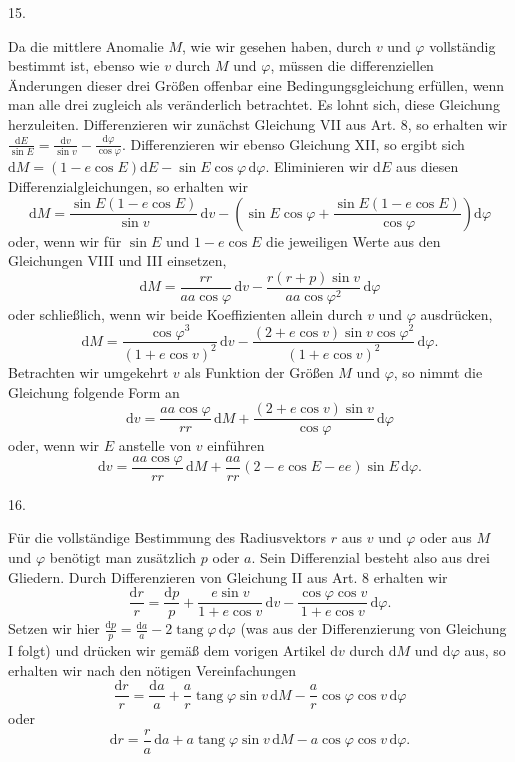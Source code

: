 \par{}
\begin{center}
\hypertarget{native-033-article015}{}15.
\end{center}
Da die mittlere Anomalie $M$, wie wir gesehen haben, durch $v$ und $\varphi$ vollständig bestimmt ist, ebenso wie $v$ durch $M$ und $\varphi$, müssen die differenziellen Änderungen dieser drei Größen offenbar eine Bedingungsgleichung erfüllen, wenn man alle drei zugleich als veränderlich betrachtet. Es lohnt sich, diese Gleichung herzuleiten. Differenzieren wir zunächst Gleichung VII aus Art. 8, so erhalten wir $\frac{\mathrm{d}E}{\sin E}=\frac{\mathrm{d}v}{\sin v}-\frac{\mathrm{d}\varphi}{\cos\varphi}$. Differenzieren wir ebenso Gleichung XII, so ergibt sich $\mathrm{d}M=(1-e\cos E)\mathrm{d}E-\sin E\cos\varphi\,\mathrm{d}\varphi$. Eliminieren wir $\mathrm{d}E$ aus diesen Differenzialgleichungen, so erhalten wir
\[
\mathrm{d}M=\frac{\sin E(1-e\cos E)}{\sin v}\,\mathrm{d}v-\left(\sin E\cos\varphi+\frac{\sin E(1-e\cos E)}{\cos\varphi}\right)\mathrm{d}\varphi
\]
oder, wenn wir für $\sin E$ und $1-e\cos E$ die jeweiligen Werte aus den Gleichungen VIII und III einsetzen,
\[
\mathrm{d}M=\frac{r r}{a a\cos\varphi}\,\mathrm{d}v-\frac{r(r+p)\sin v}{a a\cos\varphi^2}\,\mathrm{d}\varphi
\]
oder schließlich, wenn wir beide Koeffizienten allein durch $v$ und $\varphi$ ausdrücken,
\[
\mathrm{d}M=\frac{\cos\varphi^3}{(1+e\cos v)^2}\,\mathrm{d}v-\frac{(2+e\cos v)\sin v\cos\varphi^2}{(1+e\cos v)^2}\,\mathrm{d}\varphi.
\]
Betrachten wir umgekehrt $v$ als Funktion der Größen $M$ und $\varphi$, so nimmt die Gleichung folgende Form an
\[
\mathrm{d}v=\frac{a a\cos\varphi}{r r}\,\mathrm{d}M+\frac{(2+e\cos v)\sin v}{\cos\varphi}\,\mathrm{d}\varphi
\]
oder, wenn wir $E$ anstelle von $v$ einführen\,
\[
\mathrm{d}v=\frac{a a\cos\varphi}{r r}\,\mathrm{d}M+\frac{a a}{r r}(2-e\cos E-e e)\sin E\,\mathrm{d}\varphi.
\]

\par{}
\begin{center}
\hypertarget{native-034-article016}{}16.
\end{center}
Für die vollständige Bestimmung des Radiusvektors $r$ aus $v$ und $\varphi$ oder aus $M$ und $\varphi$ benötigt man zusätzlich $p$ oder $a$. Sein Differenzial besteht also aus drei Gliedern. Durch Differenzieren von Gleichung II aus Art. 8 erhalten wir
\[
\frac{\mathrm{d}r}{r}=\frac{\mathrm{d}p}{p}+\frac{e\sin v}{1+e\cos v}\,\mathrm{d}v-\frac{\cos\varphi\cos v}{1+e\cos v}\,\mathrm{d}\varphi.
\]
Setzen wir hier $\frac{\mathrm{d}p}{p}=\frac{\mathrm{d}a}{a}-2\operatorname{tang}\varphi\,\mathrm{d}\varphi$ (was aus der Differenzierung von Gleichung I folgt) und drücken wir gemäß dem vorigen Artikel $\mathrm{d}v$ durch $\mathrm{d}M$ und $\mathrm{d}\varphi$ aus, so erhalten wir nach den nötigen Vereinfachungen
\[
\frac{\mathrm{d}r}{r}=\frac{\mathrm{d}a}{a}+\frac{a}{r}\operatorname{tang}\varphi\sin v\,\mathrm{d}M-\frac{a}{r}\cos\varphi\cos v\,\mathrm{d}\varphi
\]
oder
\[
\mathrm{d}r=\frac{r}{a}\,\mathrm{d}a+a\operatorname{tang}\varphi\sin v\,\mathrm{d}M-a\cos\varphi\cos v\,\mathrm{d}\varphi.
\]

